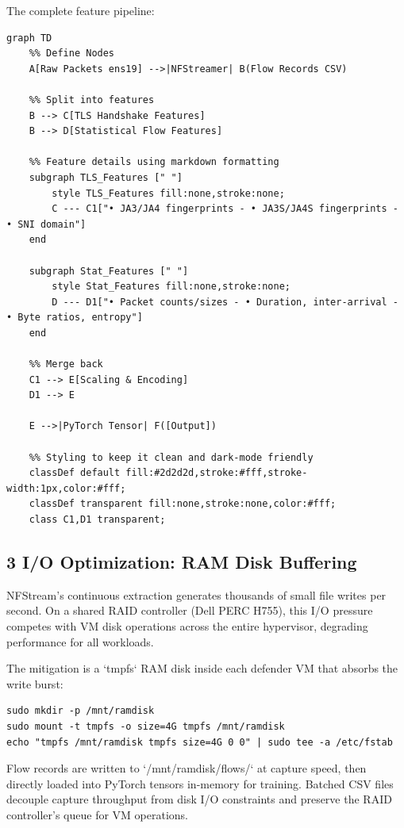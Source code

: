 \documentclass[conference]{IEEEtran}
\begin{document}
The complete feature pipeline:

\begin{verbatim}
graph TD
    %% Define Nodes
    A[Raw Packets ens19] -->|NFStreamer| B(Flow Records CSV)
    
    %% Split into features
    B --> C[TLS Handshake Features]
    B --> D[Statistical Flow Features]
    
    %% Feature details using markdown formatting
    subgraph TLS_Features [" "]
        style TLS_Features fill:none,stroke:none;
        C --- C1["• JA3/JA4 fingerprints - • JA3S/JA4S fingerprints - • SNI domain"]
    end

    subgraph Stat_Features [" "]
        style Stat_Features fill:none,stroke:none;
        D --- D1["• Packet counts/sizes - • Duration, inter-arrival - • Byte ratios, entropy"]
    end
    
    %% Merge back
    C1 --> E[Scaling & Encoding]
    D1 --> E
    
    E -->|PyTorch Tensor| F([Output])

    %% Styling to keep it clean and dark-mode friendly
    classDef default fill:#2d2d2d,stroke:#fff,stroke-width:1px,color:#fff;
    classDef transparent fill:none,stroke:none,color:#fff;
    class C1,D1 transparent;
\end{verbatim}


\subsection{3 I/O Optimization: RAM Disk Buffering}

NFStream's continuous extraction generates thousands of small file writes per second. On a shared RAID controller (Dell PERC H755), this I/O pressure competes with VM disk operations across the entire hypervisor, degrading performance for all workloads.

The mitigation is a `tmpfs` RAM disk inside each defender VM that absorbs the write burst:

\begin{verbatim}
sudo mkdir -p /mnt/ramdisk
sudo mount -t tmpfs -o size=4G tmpfs /mnt/ramdisk
echo "tmpfs /mnt/ramdisk tmpfs size=4G 0 0" | sudo tee -a /etc/fstab
\end{verbatim}

Flow records are written to `/mnt/ramdisk/flows/` at capture speed, then directly loaded into PyTorch tensors in-memory for training. Batched CSV files decouple capture throughput from disk I/O constraints and preserve the RAID controller's queue for VM operations.
\end{document}
